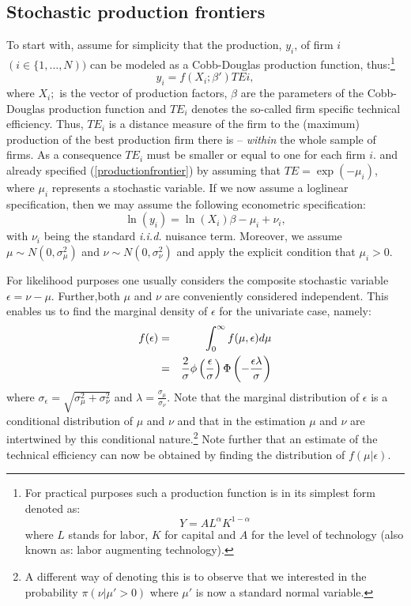 \documentclass[11pt,parskip,abstracton,notitlepage]{scrartcl}
\begin{document}
\subsection{Stochastic production frontiers}\label{sub:spf}
%
To start with, assume for simplicity that the production, $y_i$, of firm $i$ $(i \in \{1,\ldots,N))$ can be modeled as a Cobb-Douglas production function, thus:\footnote{For practical purposes such a production function is in its simplest form denoted as:\begin{equation*} Y = AL^\alpha K^{1-\alpha}\end{equation*} where $L$ stands for labor, $K$ for capital and $A$ for the level of technology (also known as: labor augmenting technology).} 
%
\begin{equation}
y_i = f(X_i;\beta'){TE}{i},
\label{productionfrontier}
\end{equation}
%
where $X_i;$ is the vector of production factors, $\beta$ are the parameters of the Cobb-Douglas production function and ${TE}_i$ denotes the so-called firm specific technical efficiency. Thus, ${TE}_i$ is a distance measure of the firm to the (maximum) production of the best production firm there is -- \emph{within} the whole sample of firms. As a consequence ${TE}_i$ must be smaller or equal to one for each firm $i$.
%
\citet{AIGNER1977} and \citet{MEEUSEN1977} already specified (\ref{productionfrontier}) by assuming that $TE = \exp(-\mu_i)$, where $\mu_i$ represents a stochastic variable. If we now assume a loglinear specification, then we may assume the following econometric specification:
%
\begin{equation}
\ln \left(y_i\right) = \ln({X}_i) \beta - \mu_i + \nu_i,
\label{specification}
\end{equation}
%
with $\nu_i$ being the standard \emph{i.i.d.} nuisance term. Moreover, we assume $\mu\sim N(0,\sigma^2_\mu)$ and $\nu \sim N(0,\sigma^2_\nu)$ and apply the explicit condition that $\mu_i > 0$. 

For likelihood purposes one usually considers the composite stochastic variable $\epsilon = \nu-\mu$. Further,both $\mu$ and $\nu$ are conveniently considered independent. This enables us to find the marginal density of $\epsilon$ for the univariate case, namely:
%
\begin{eqnarray}
f(\epsilon)	&=& \int_0^\infty f(\mu, \epsilon)d\mu \notag\\
						&=& \frac{2}{\sigma}\phi\left(\frac{\epsilon}{\sigma}\right)\Phi\left(-\frac{\epsilon\lambda}{\sigma}\right)
\label{likelihood}
\end{eqnarray}
%
where $\sigma_\epsilon = \sqrt{\sigma_\mu^2 + \sigma_\nu^2}$ and $\lambda = \frac{\sigma_\mu}{\sigma_\nu}$. Note that the marginal distribution of $\epsilon$ is a conditional distribution of $\mu$ and $\nu$ and that in the estimation $\mu$ and $\nu$ are intertwined by this conditional nature.\footnote{A different way of denoting this is to observe that we interested in the probability $\pi(\nu|\mu'>0)$ where $\mu'$ is now a standard normal variable.} Note further that an estimate of the technical efficiency can now be obtained by finding the distribution of $f(\mu|\epsilon)$. 
\end{document}
